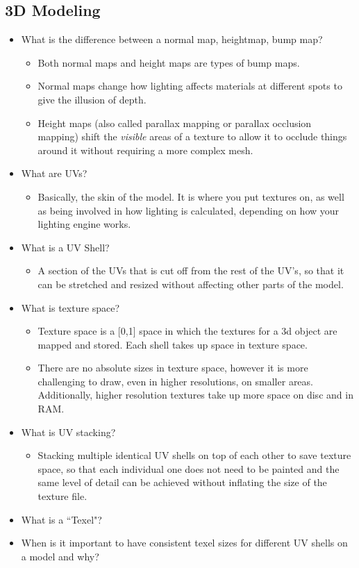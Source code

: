 \documentclass{article}
\begin{document}
\subsection{3D Modeling}
\begin{itemize}
    \item What is the difference between a normal map, heightmap, bump map?
    \begin{itemize}
        \item Both normal maps and height maps are types of bump maps.
        \item Normal maps change how lighting affects materials at different spots to give the illusion of depth.
        \item Height maps (also called parallax mapping or parallax occlusion mapping) shift the \textit{visible} areas of a texture to allow it to occlude things around it without requiring a more complex mesh.
    \end{itemize}
    \item What are UVs?
    \begin{itemize}
        \item Basically, the skin of the model. It is where you put textures on, as well as being involved in how lighting is calculated, depending on how your lighting engine works.
    \end{itemize}
    \item What is a UV Shell?
    \begin{itemize}
        \item A section of the UVs that is cut off from the rest of the UV's, so that it can be stretched and resized without affecting other parts of the model.
    \end{itemize}
    \item What is texture space?
    \begin{itemize}
        \item Texture space is a [0,1] space in which the textures for a 3d object are mapped and stored. Each shell takes up space in texture space.
        \item There are no absolute sizes in texture space, however it is more challenging to draw, even in higher resolutions, on smaller areas. Additionally, higher resolution textures take up more space on disc and in RAM.
    \end{itemize}
    \item What is UV stacking?
    \begin{itemize}
        \item Stacking multiple identical UV shells on top of each other to save texture space, so that each individual one does not need to be painted and the same level of detail can be achieved without inflating the size of the texture file.
    \end{itemize}
    \item What is a ``Texel"?
    \item When is it important to have consistent texel sizes for different UV shells on a model and why?
\end{itemize}
\end{document}
